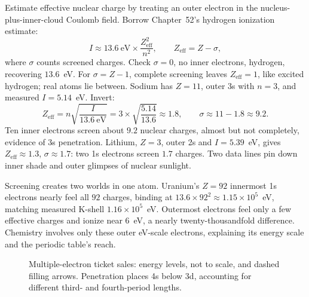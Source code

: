 Estimate effective nuclear charge by treating an outer electron in the nucleus-plus-inner-cloud Coulomb field. Borrow Chapter~52's hydrogen ionization estimate:
\[
I\approx 13.6\ \text{eV}\times\frac{Z_{\mathrm{eff}}^2}{n^2},
\qquad Z_{\mathrm{eff}}=Z-\sigma ,
\]
where \(\sigma\) counts screened charges. Check \(\sigma=0\), no inner electrons, hydrogen, recovering \(13.6\)~eV. For \(\sigma=Z-1\), complete screening leaves \(Z_{\mathrm{eff}}=1\), like excited hydrogen; real atoms lie between. Sodium has \(Z=11\), outer 3s with \(n=3\), and measured \(I=5.14\)~eV. Invert:
\[
Z_{\mathrm{eff}}=n\sqrt{\frac{I}{13.6\ \text{eV}}}=3\times\sqrt{\frac{5.14}{13.6}}\approx 1.8,
\qquad \sigma\approx 11-1.8\approx 9.2 .
\]
Ten inner electrons screen about \(9.2\) nuclear charges, almost but not completely, evidence of 3s penetration. Lithium, \(Z=3\), outer 2s and \(I=5.39\)~eV, gives \(Z_{\mathrm{eff}}\approx1.3\), \(\sigma\approx1.7\): two 1s electrons screen \(1.7\) charges. Two data lines pin down inner shade and outer glimpses of nuclear sunlight.

Screening creates two worlds in one atom. Uranium's \(Z=92\) innermost 1s electrons nearly feel all \(92\) charges, binding at \(13.6\times92^2\approx1.15\times10^5\)~eV, matching measured K-shell \(1.16\times10^5\)~eV. Outermost electrons feel only a few effective charges and ionize near \(6\)~eV, a nearly twenty-thousandfold difference. Chemistry involves only these outer eV-scale electrons, explaining its energy scale and the periodic table's reach.

\begin{figure}[htbp]
\centering
{}
\caption{Multiple-electron ticket sales: energy levels, not to scale, and dashed filling arrows. Penetration places 4s below 3d, accounting for different third- and fourth-period lengths.}
\end{figure}

